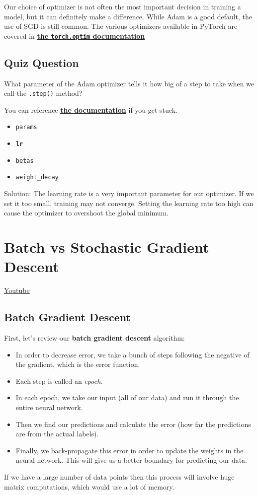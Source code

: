 Our choice of optimizer is not often the most important decision in training a model, but it can definitely make a difference. While Adam is a good default, the use of SGD is still common. The various optimizers available in PyTorch are covered in \href{https://pytorch.org/docs/stable/optim.html}{\textbf{the \lstinline{torch.optim} documentation}}

\subsection{Quiz Question}

What parameter of the Adam optimizer tells it how big of a step to take when we call the \verb|.step()| method?

You can reference \href{https://pytorch.org/docs/stable/generated/torch.optim.Adam.html\#torch.optim.Adam}{\textbf{the documentation}} if you get stuck.
\begin{itemize}
    \item \lstinline{params}
    \item \textbf{\lstinline{lr}}
    \item \lstinline{betas}
    \item \lstinline{weight_decay}
\end{itemize}
Solution: The learning rate is a very important parameter for our optimizer. If we set it too small, training may not converge. Setting the learning rate too high can cause the optimizer to overshoot the global minimum.

\section{Batch vs Stochastic Gradient Descent}
\href{https://www.youtube.com/watch?v=2p58rVgqsgo&t=1s&ab_channel=Udacity}{Youtube}
\subsection{Batch Gradient Descent}

First, let's review our \textbf{batch gradient descent} algorithm:

\begin{itemize}
    \item In order to decrease error, we take a bunch of steps following the negative of the gradient, which is the error function.
    \item Each step is called an \textit{epoch}.
    \item In each epoch, we take our input (all of our data) and run it through the entire neural network.
    \item Then we find our predictions and calculate the error (how far the predictions are from the actual labels).
    \item Finally, we back-propagate this error in order to update the weights in the neural network. This will give us a better boundary for predicting our data.
\end{itemize}
If we have a large number of data points then this process will involve huge matrix computations, which would use a lot of memory.

